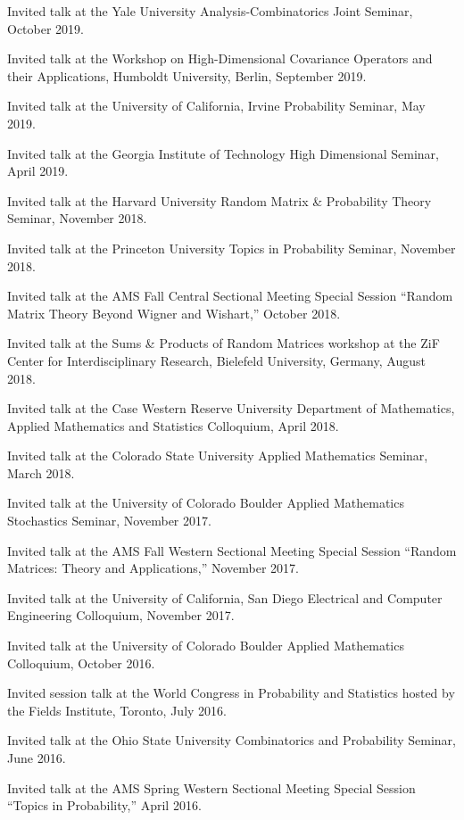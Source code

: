 \documentclass[letterpaper]{article}
\renewenvironment{itemize}{
  \begin{list}{}{
    \setlength{\leftmargin}{1em}
  }
}{
  \end{list}
}
\begin{document}
\begin{itemize}
	\item Invited talk at the Yale University Analysis-Combinatorics Joint Seminar, October 2019.  
	\item Invited talk at the Workshop on High-Dimensional Covariance Operators and their Applications, Humboldt University, Berlin, September 2019.  
	\item Invited talk at the University of California, Irvine Probability Seminar, May 2019.  
	\item Invited talk at the Georgia Institute of Technology High Dimensional Seminar, April 2019.  
	\item Invited talk at the Harvard University Random Matrix \& Probability Theory Seminar, November 2018.  
	\item Invited talk at the Princeton University Topics in Probability Seminar, November 2018.  
	\item Invited talk at the AMS Fall Central Sectional Meeting Special Session ``Random Matrix Theory Beyond Wigner and Wishart,'' October 2018.  
	\item Invited talk at the Sums \& Products of Random Matrices workshop at the ZiF Center for Interdisciplinary Research, Bielefeld University, Germany, August 2018.
	\item Invited talk at the Case Western Reserve University Department of Mathematics, Applied Mathematics and Statistics Colloquium, April 2018.  
	\item Invited talk at the Colorado State University Applied Mathematics Seminar, March 2018.  
	\item Invited talk at the University of Colorado Boulder Applied Mathematics Stochastics Seminar, November 2017.  
	\item Invited talk at the AMS Fall Western Sectional Meeting Special Session ``Random Matrices: Theory and Applications,'' November 2017.  
	\item Invited talk at the University of California, San Diego Electrical and Computer Engineering Colloquium, November 2017.  
	\item Invited talk at the University of Colorado Boulder Applied Mathematics Colloquium, October 2016.  
	\item Invited session talk at the World Congress in Probability and Statistics hosted by the Fields Institute, Toronto, July 2016.
	\item Invited talk at the Ohio State University Combinatorics and Probability Seminar, June 2016.
	\item Invited talk at the AMS Spring Western Sectional Meeting Special Session ``Topics in Probability,'' April 2016.  

\end{itemize}
\end{document}
